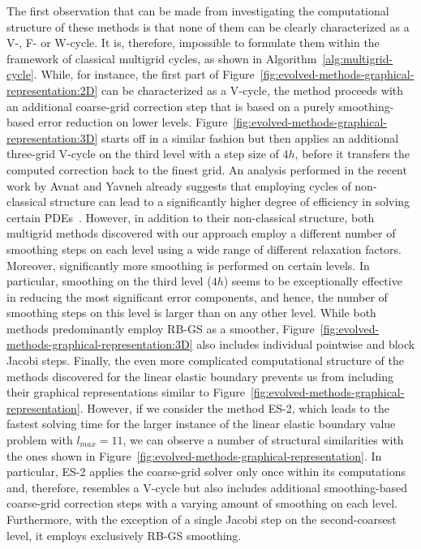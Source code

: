 The first observation that can be made from investigating the computational structure of these methods is that none of them can be clearly characterized as a V-, F- or W-cycle.
It is, therefore, impossible to formulate them within the framework of classical multigrid cycles, as shown in Algorithm~\ref{alg:multigrid-cycle}.
While, for instance, the first part of Figure~\ref{fig:evolved-methods-graphical-representation:2D} can be characterized as a V-cycle, the method proceeds with an additional coarse-grid correction step that is based on a purely smoothing-based error reduction on lower levels.
Figure~\ref{fig:evolved-methods-graphical-representation:3D} starts off in a similar fashion but then applies an additional three-grid V-cycle on the third level with a step size of $4h$, before it transfers the computed correction back to the finest grid.
An analysis performed in the recent work by Avnat and Yavneh already suggests that employing cycles of non-classical structure can lead to a significantly higher degree of efficiency in solving certain PDEs~\cite{avnat2022recursive}. 
However, in addition to their non-classical structure, both multigrid methods discovered with our approach employ a different number of smoothing steps on each level using a wide range of different relaxation factors. 
Moreover, significantly more smoothing is performed on certain levels.
In particular, smoothing on the third level ($4h$) seems to be exceptionally effective in reducing the most significant error components, and hence, the number of smoothing steps on this level is larger than on any other level.
While both methods predominantly employ RB-GS as a smoother, Figure~\ref{fig:evolved-methods-graphical-representation:3D} also includes individual pointwise and block Jacobi steps.
Finally, the even more complicated computational structure of the methods discovered for the linear elastic boundary prevents us from including their graphical representations similar to Figure~\ref{fig:evolved-methods-graphical-representation}.
However, if we consider the method ES-2, which leads to the fastest solving time for the larger instance of the linear elastic boundary value problem with $l_{max} = 11$, we can observe a number of structural similarities with the ones shown in Figure~\ref{fig:evolved-methods-graphical-representation}.
In particular, ES-2 applies the coarse-grid solver only once within its computations and, therefore, resembles a V-cycle but also includes additional smoothing-based coarse-grid correction steps with a varying amount of smoothing on each level.
Furthermore, with the exception of a single Jacobi step on the second-coarsest level, it employs exclusively RB-GS smoothing.


